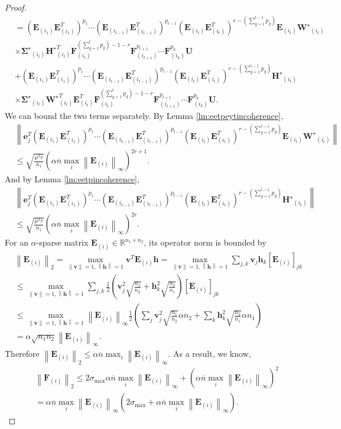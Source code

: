 \documentclass[twoside,11pt]{article}
\newcommand{\norm}[1]{\left\lVert#1\right\rVert}
\newcommand{\matE}{\mathbf{E}}
\newcommand{\matF}{\mathbf{F}}
\newcommand{\matHst}{{\mathbf{H}^\star}}
\newcommand{\matSigmast}{{\mathbf{\Sigma}^\star}}
\newcommand{\matU}{\mathbf{U}}
\newcommand{\matWst}{{\mathbf{W}^\star}}
\newcommand{\vecv}{\mathbf{v}}
\newcommand{\vech}{\mathbf{h}}
\newcommand{\vece}{\mathbf{e}}
\newcommand{\gop}{\sigma_{\max}}
\newcommand{\fracud}{\frac{1}{2}}
\newcommand{\bn}{{\overline{n}}}
\newcommand{\abnb}{\alpha \bn\max_{i}\norm{\matE_{(i)}}_{\infty}}
\newcommand{\murnone}{\frac{\mu^2 r}{n_1}}
\begin{document}
\begin{proof}
$$\begin{aligned}
&=\left(\matE_{(i_1)}\matE_{(i_1)}^T\right)^{p_1}\cdots\left(\matE_{(i_{t-1})}\matE_{(i_{t-1})}^T\right)^{p_{t-1}}\left(\matE_{(i_t)}\matE_{(i_t)}^T\right)^{r-(\sum_{g=1}^{t-1}p_g)}\matE_{(i_t)}\matWst_{(i_t)}\\
&\times \matSigmast_{(i_t)}\matHst_{(i_t)}^T\matF_{(i_t)}^{(\sum_{g=1}^{t}p_g)-1-r}\matF_{(i_{t+1})}^{p_{t+1}}\cdots\matF_{(i_k)}^{p_k}\matU
\\
&+\left(\matE_{(i_1)}\matE_{(i_1)}^T\right)^{p_1}\cdots\left(\matE_{(i_{t-1})}\matE_{(i_{t-1})}^T\right)^{p_{t-1}}\left(\matE_{(i_t)}\matE_{(i_t)}^T\right)^{r-(\sum_{g=1}^{t-1}p_g)}\matHst_{(i_t)}\\
&\times \matSigmast_{(i_t)}\matWst_{(i_t)}^T\matE_{(i_t)}^T\matF_{(i_t)}^{(\sum_{g=1}^{t}p_g)-1-r}\matF_{(i_{t+1})}^{p_{t+1}}\cdots\matF_{(i_k)}^{p_k}\matU.
\end{aligned}
$$
We can bound the two terms separately. By Lemma \ref{lm:eetpeytincoherence},
$$
\begin{aligned}
&\norm{\vece_j^T\left(\matE_{(i_1)}\matE_{(i_1)}^T\right)^{p_1}\cdots\left(\matE_{(i_{t-1})}\matE_{(i_{t-1})}^T\right)^{p_{t-1}}\left(\matE_{(i_t)}\matE_{(i_t)}^T\right)^{r-(\sum_{g=1}^{t-1}p_g)}\matE_{(i_t)}\matWst_{(i_t)}}\\
&\le \sqrt{\murnone}\left(\abnb\right)^{2r+1}.
\end{aligned}
$$
And by Lemma \ref{lm:eetpincoherence},
$$
\begin{aligned}
&\norm{\vece_j^T\left(\matE_{(i_1)}\matE_{(i_1)}^T\right)^{p_1}\cdots\left(\matE_{(i_{t-1})}\matE_{(i_{t-1})}^T\right)^{p_{t-1}}\left(\matE_{(i_t)}\matE_{(i_t)}^T\right)^{r-(\sum_{g=1}^{t-1}p_g)}\matHst_{(i_t)}}\\
&\le \sqrt{\murnone}\left(\abnb\right)^{2r}.
\end{aligned}
$$
For an $\alpha$-sparse matrix $\matE_{(i)}\in \mathbb{R}^{n_1\times n_2}$, its operator norm is bounded by 
$$
\begin{aligned}
&\norm{\matE_{(i)}}_2=\max_{\norm{\vecv}=1,\norm{\vech}=1}\vecv^T \matE_{(i)}\vech=\max_{\norm{\vecv}=1,\norm{\vech}=1}\sum_{j,k}\vecv_j\vech_k[\matE_{(i)}]_{jk}\\
&\le \max_{\norm{\vecv}=1,\norm{\vech}=1}\sum_{j,k}\fracud\left(\vecv_j^2\sqrt{\frac{n_1}{n_2}}+\vech_k^2\sqrt{\frac{n_2}{n_1}}\right)[\matE_{(i)}]_{jk}\\
&\le \max_{\norm{\vecv}=1,\norm{\vech}=1}\norm{\matE_{(i)}}_{\infty}\fracud\left(\sum_{j}\vecv_j^2\sqrt{\frac{n_1}{n_2}}\alpha n_2+\sum_{k}\vech_k^2 \sqrt{\frac{n_2}{n_1}}\alpha n_1\right)\\
&=\alpha \sqrt{n_1n_2} \norm{\matE_{(i)}}_{\infty}.
\end{aligned}
$$
Therefore $\norm{\matE_{(i)}}_2\le \abnb$. As a result, we know,
$$
\begin{aligned}
&\norm{\matF_{(i)}}_2\le 2\gop\abnb+\left(\abnb\right)^2\\
&=\abnb\left(2\gop+\abnb\right).    
\end{aligned}
$$


\end{proof}
\end{document}
